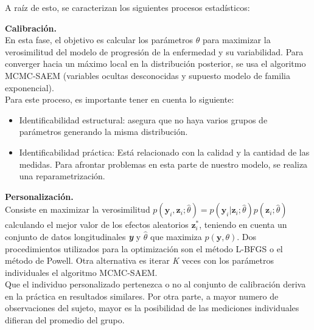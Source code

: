 \documentclass[12pt]{article}
\begin{document}
A raíz de esto, se caracterizan los siguientes procesos estadísticos:
\begin{description}
	\item {\textbf{Calibración.}}\\
	En esta fase, el objetivo es calcular los parámetros $\hat{\theta}$ para maximizar la verosimilitud del modelo de progresión de la enfermedad y su variabilidad. Para converger hacia un máximo local en la distribución posterior, se usa el algoritmo MCMC-SAEM (variables ocultas desconocidas y supuesto modelo de familia exponencial). \\
	
	Para este proceso, es importante tener en cuenta lo siguiente:
	\begin{itemize}
		\item Identificabilidad estructural: asegura que no haya varios grupos de parámetros generando la misma distribución.
		\item Identificabilidad práctica: Está relacionado con la calidad y la cantidad de las medidas. Para afrontar problemas en esta parte de nuestro modelo, se realiza una reparametrización.
	\end{itemize}
	\item {\textbf{Personalización.}}\\
	Consiste en maximizar la verosimilitud $p(\mathbf{y}_{i}, \mathbf{z}_{i};\hat{\theta})=p(\mathbf{y}_{i}| \mathbf{z}_{i};\hat{\theta})p( \mathbf{z}_{i};\hat{\theta})$ calculando el mejor valor de los efectos aleatorios $\mathbf{z}_{i}^{*}$, teniendo en cuenta un conjunto de datos longitudinales \textit{\textbf{y}} y $\hat{\theta}$ que maximiza $p(\mathbf{y},\theta)$. Dos procedimientos utilizados para la optimización son el método L-BFGS o el método de Powell. Otra alternativa es iterar \textit{K} veces con los parámetros individuales el algoritmo MCMC-SAEM.\\
	
	Que el individuo personalizado pertenezca o no al conjunto de calibración deriva en la práctica en resultados similares. Por otra parte, a mayor numero de observaciones del sujeto, mayor es la posibilidad de las mediciones individuales difieran del promedio del grupo.	
	

\end{description}
\end{document}
